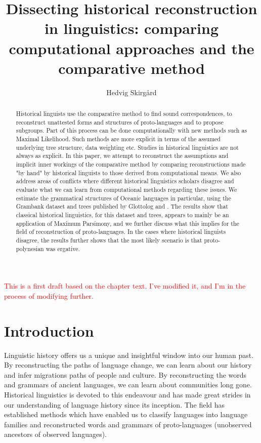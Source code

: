 \documentclass[draft,10pt]{article} %
\title{Dissecting historical reconstruction in linguistics: comparing computational approaches and the comparative method}
\author{Hedvig Skirg{\aa}rd}
\begin{document}
\def\code#1{\texttt{#1}}

\thispagestyle{empty}

\maketitle
\thispagestyle{empty}

\tableofcontents
\newpage

\textcolor{red}{This is a first draft based on the chapter text. I've modified it, and I'm in the process of modifying further. }



\begin{abstract}
Historical linguists use the comparative method to find sound correspondences, to reconstruct unattested forms and structures of proto-languages and to propose subgroups. Part of this process can be done computationally with new methods such as Maximal Likelihood. Such methods are more explicit in terms of the assumed underlying tree structure, data weighting etc. Studies in historical linguistics are not always as explicit. In this paper, we attempt to reconstruct the assumptions and implicit inner workings of the comparative method by comparing reconstructions made "by hand" by historical linguists to those derived from computational means. We also address areas of conflicts where different historical linguistics scholars disagree and evaluate what we can learn from computational methods regarding these issues. We estimate the grammatical structures of Oceanic languages in particular, using the Grambank dataset and trees published by Glottolog and \citet{grayetal_2009}. The results show that classical historical linguistics, for this dataset and trees, appears to mainly be an application of Maximum Parsimony, and we further discuss what this implies for the field of reconstruction of proto-languages. In the cases where historical linguists disagree, the results further shows that the most likely scenario is that proto-polynesian was ergative.
\end{abstract}
\newpage

\doublespacing
\section{Introduction}
\label{acr:intro}
Linguistic history offers us a unique and insightful window into our human past. By reconstructing the paths of language change, we can learn about our history and infer migrations paths of people and culture. By reconstructing the words and grammars of ancient languages, we can learn about communities long gone. Historical linguistics is devoted to this endeavour and has made great strides in our understanding of language history since its inception. The field has established methods which have enabled us to classify languages into language families and reconstructed words and grammars of proto-languages (unobserved ancestors of observed languages). 
\end{document}
